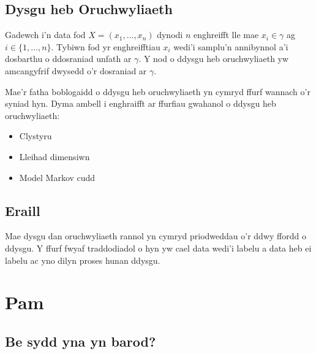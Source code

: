 \subsection{Dysgu heb Oruchwyliaeth}

Gadewch i'n data fod $X = (x_{1}, \dots, x_{n}) $ dynodi $n$ enghreifft lle mae $x_{i} \in \gamma$ ag $i \in \{ 1, \dots, n \}$. Tybiwn fod yr enghreifftiau $x_{i}$ wedi'i samplu'n annibynnol a'i dosbarthu o ddosraniad unfath ar $\gamma$. Y nod o ddysgu heb oruchwyliaeth yw amcangyfrif dwysedd o'r dosraniad ar $\gamma$.\cite{dysgu-peirianyddol}

Mae'r fatha boblogaidd o ddysgu heb oruchwyliaeth yn cymryd ffurf wannach o'r syniad hyn. Dyma ambell i enghraifft ar ffurfiau gwahanol o ddysgu heb oruchwyliaeth:

\begin{itemize}
	\item Clystyru
	\item Lleihad dimensiwn
	\item Model Markov cudd
\end{itemize}


\subsection{Eraill}

Mae dysgu dan oruchwyliaeth rannol yn cymryd priodweddau o'r ddwy ffordd o ddysgu. Y ffurf fwyaf traddodiadol o hyn yw cael data wedi'i labelu a data heb ei labelu ac yno dilyn proses hunan ddysgu.


\section{Pam}


\subsection{Be sydd yna yn barod?}

